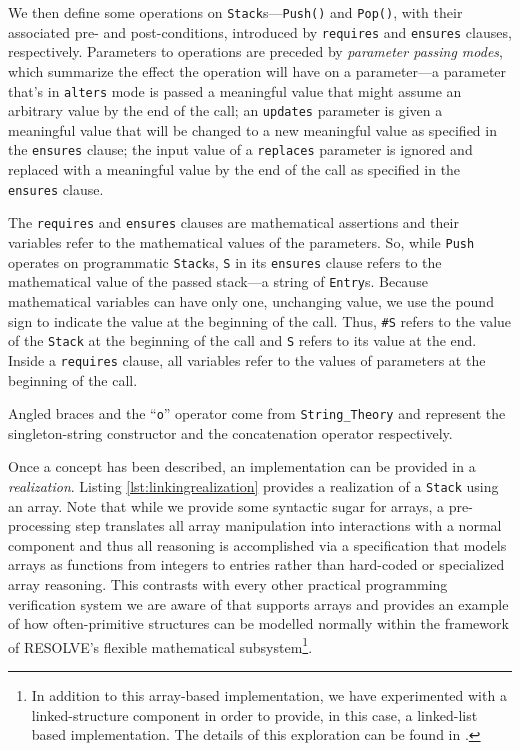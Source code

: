 We then define some operations on \texttt{Stack}s---\texttt{Push()} and \texttt{Pop()}, with their associated pre- and post-conditions, introduced by \texttt{requires} and \texttt{ensures} clauses, respectively.  Parameters to operations are preceded by \emph{parameter passing modes}, which summarize the effect the operation will have on a parameter---a parameter that's in \texttt{alters} mode is passed a meaningful value that might assume  an arbitrary value by the end of the call; an \texttt{updates} parameter is given a meaningful value that will be changed to a new meaningful value as specified in the \texttt{ensures} clause;  the input value of a \texttt{replaces} parameter is ignored and replaced with a meaningful value by the end of the call as specified in the \texttt{ensures} clause.

The \texttt{requires} and \texttt{ensures} clauses are mathematical assertions and their variables refer to the mathematical values of the parameters.  So, while \texttt{Push} operates on programmatic \texttt{Stack}s, \texttt{S} in its \texttt{ensures} clause refers to the mathematical value of the passed stack---a string of \texttt{Entry}s.  Because mathematical variables can have only one, unchanging value, we use the pound sign to indicate the value at the beginning of the call.  Thus, \texttt{\#S} refers to the value of the \texttt{Stack} at the beginning of the call and \texttt{S} refers to its value at the end.  Inside a \texttt{requires} clause, all variables refer to the values of parameters at the beginning of the call.

Angled braces and the ``\texttt{o}'' operator come from \texttt{String\_Theory} and represent the singleton-string constructor and the concatenation operator respectively.

Once a concept has been described, an implementation can be provided in a \emph{realization}.  Listing \ref{lst:linkingrealization} provides a realization of a \texttt{Stack} using an array.  Note that while we provide some syntactic sugar for arrays, a pre-processing step translates all array manipulation into interactions with a normal component and thus all reasoning is accomplished via a specification that models arrays as functions from integers to entries rather than hard-coded or specialized array reasoning.  This contrasts with every other practical programming verification system we are aware of that supports arrays and provides an example of how often-primitive structures can be modelled normally within the framework of RESOLVE's flexible mathematical subsystem\footnote{In addition to this array-based implementation, we have experimented with a linked-structure component in order to provide, in this case, a linked-list based implementation.  The details of this exploration can be found in \cite{kulczyckiPointers}.}.

